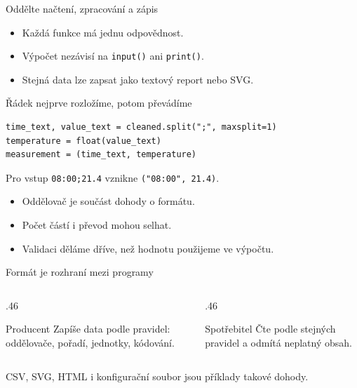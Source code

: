 \documentclass[aspectratio=169]{beamer}
\begin{document}
\begin{frame}{Oddělte načtení, zpracování a zápis}
  \centering
  \vspace{5mm}

  \begin{itemize}
    \item Každá funkce má jednu odpovědnost.
    \item Výpočet nezávisí na \texttt{input()} ani \texttt{print()}.
    \item Stejná data lze zapsat jako textový report nebo SVG.
  \end{itemize}
\end{frame}

\begin{frame}[fragile]{Řádek nejprve rozložíme, potom převádíme}
\begin{lstlisting}[style=python]
time_text, value_text = cleaned.split(";", maxsplit=1)
temperature = float(value_text)
measurement = (time_text, temperature)
\end{lstlisting}
  Pro vstup \texttt{08:00;21.4} vznikne \texttt{("08:00", 21.4)}.
  \begin{itemize}
    \item Oddělovač je součást dohody o formátu.
    \item Počet částí i převod mohou selhat.
    \item Validaci děláme dříve, než hodnotu použijeme ve výpočtu.
  \end{itemize}
\end{frame}

\begin{frame}{Formát je rozhraní mezi programy}
  \begin{columns}[T]
    \begin{column}{.46\textwidth}
      \begin{block}{Producent}
        Zapíše data podle pravidel: oddělovače, pořadí, jednotky, kódování.
      \end{block}
    \end{column}
    \begin{column}{.46\textwidth}
      \begin{block}{Spotřebitel}
        Čte podle stejných pravidel a odmítá neplatný obsah.
      \end{block}
    \end{column}
  \end{columns}
  \vspace{4mm}
  CSV, SVG, HTML i konfigurační soubor jsou příklady takové dohody.
\end{frame}
\end{document}

